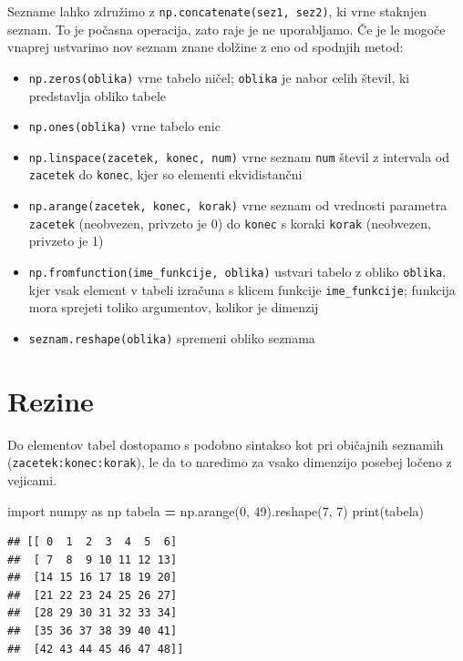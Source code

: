 \documentclass[
]{report}
\newenvironment{Shaded}{\begin{snugshade}}{\end{snugshade}}
\newcommand{\BuiltInTok}[1]{#1}
\newcommand{\DecValTok}[1]{\textcolor[rgb]{0.00,0.00,0.81}{#1}}
\newcommand{\ImportTok}[1]{#1}
\newcommand{\NormalTok}[1]{#1}
\newcommand{\OperatorTok}[1]{\textcolor[rgb]{0.81,0.36,0.00}{\textbf{#1}}}
\providecommand{\tightlist}{%
  \setlength{\itemsep}{0pt}\setlength{\parskip}{0pt}}
\begin{document}
Sezname lahko združimo z \texttt{np.concatenate(sez1,\ sez2)}, ki vrne staknjen seznam. To je počasna operacija, zato raje je ne uporabljamo. Če je le mogoče vnaprej ustvarimo nov seznam znane dolžine z eno od spodnjih metod:

\begin{itemize}
\tightlist
\item
  \texttt{np.zeros(oblika)} vrne tabelo ničel; \texttt{oblika} je nabor celih števil, ki predstavlja obliko tabele
\item
  \texttt{np.ones(oblika)} vrne tabelo enic
\item
  \texttt{np.linspace(zacetek,\ konec,\ num)} vrne seznam \texttt{num} števil z intervala od \texttt{zacetek} do \texttt{konec}, kjer so elementi ekvidistančni
\item
  \texttt{np.arange(zacetek,\ konec,\ korak)} vrne seznam od vrednosti parametra \texttt{zacetek} (neobvezen, privzeto je 0) do \texttt{konec} s koraki \texttt{korak} (neobvezen, privzeto je 1)
\item
  \texttt{np.fromfunction(ime\_funkcije,\ oblika)} ustvari tabelo z obliko \texttt{oblika}, kjer
  vsak element v tabeli izračuna s klicem funkcije \texttt{ime\_funkcije}; funkcija mora sprejeti toliko argumentov, kolikor je dimenzij
\item
  \texttt{seznam.reshape(oblika)} spremeni obliko seznama
\end{itemize}

\hypertarget{rezine}{%
\section{Rezine}\label{rezine}}

Do elementov tabel dostopamo s podobno sintakso kot pri običajnih seznamih
(\texttt{zacetek:konec:korak}), le da to naredimo za vsako dimenzijo posebej ločeno z vejicami.

\begin{Shaded}
\begin{Highlighting}[]
\ImportTok{import}\NormalTok{ numpy }\ImportTok{as}\NormalTok{ np}
\NormalTok{tabela }\OperatorTok{=}\NormalTok{ np.arange(}\DecValTok{0}\NormalTok{, }\DecValTok{49}\NormalTok{).reshape(}\DecValTok{7}\NormalTok{, }\DecValTok{7}\NormalTok{)}
\BuiltInTok{print}\NormalTok{(tabela)}
\end{Highlighting}
\end{Shaded}

\begin{verbatim}
## [[ 0  1  2  3  4  5  6]
##  [ 7  8  9 10 11 12 13]
##  [14 15 16 17 18 19 20]
##  [21 22 23 24 25 26 27]
##  [28 29 30 31 32 33 34]
##  [35 36 37 38 39 40 41]
##  [42 43 44 45 46 47 48]]
\end{verbatim}
\end{document}
